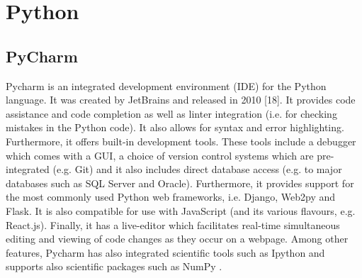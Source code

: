 \section{Python}
\subsection{PyCharm}
Pycharm is an integrated development environment (IDE) for the Python language. It was created by JetBrains and released in 2010 [18]. It provides code assistance and code completion as well as linter integration (i.e. for checking mistakes in the Python code). It also allows for syntax and error highlighting. Furthermore, it offers built-in development tools. These tools include a debugger which comes with a GUI, a choice of version control systems which are pre-integrated (e.g. Git) and it also includes direct database access (e.g. to major databases such as SQL Server and Oracle). Furthermore, it provides support for the most commonly used Python web frameworks, i.e. Django, Web2py and Flask. It is also compatible for use with JavaScript (and its various flavours, e.g. React.js). Finally, it has a live-editor which facilitates real-time simultaneous editing and viewing of code changes as they occur on a webpage. Among other features, Pycharm has also integrated scientific tools such as Ipython and supports also scientific packages such as NumPy \cite{pycharm}.
